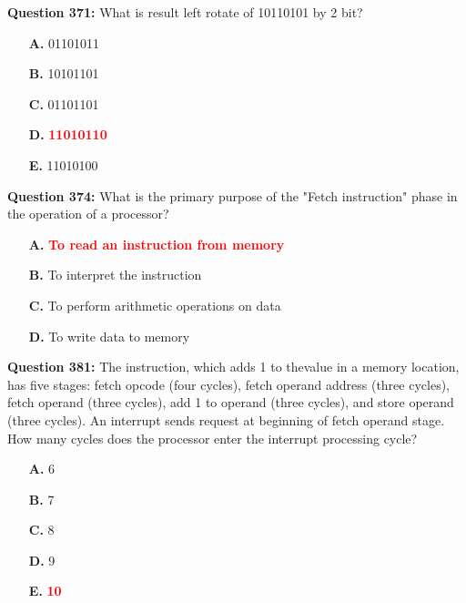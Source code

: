 \documentclass[12pt,a4paper]{article}
\begin{document}
\vspace{0.5cm}

\textbf{Question 371:} What is result left rotate of 10110101 by 2 bit?

\begin{itemize}
    \item[\textbf{A.}] 01101011
    \item[\textbf{B.}] 10101101
    \item[\textbf{C.}] 01101101
    \item[\textbf{D.}] \textcolor{red}{\textbf{11010110}}
    \item[\textbf{E.}] 11010100
\end{itemize}

\vspace{0.5cm}

\textbf{Question 374:} What is the primary purpose of the "Fetch instruction" phase in the operation of a processor?

\begin{itemize}
    \item[\textbf{A.}] \textcolor{red}{\textbf{To read an instruction from memory}}
    \item[\textbf{B.}] To interpret the instruction
    \item[\textbf{C.}] To perform arithmetic operations on data
    \item[\textbf{D.}] To write data to memory
\end{itemize}

\vspace{0.5cm}

\textbf{Question 381:} The instruction, which adds 1 to thevalue in a memory location, has five stages: fetch opcode (four cycles), fetch operand address (three cycles), fetch operand (three cycles), add 1 to operand (three cycles), and store operand (three cycles). An interrupt sends request at beginning of fetch operand stage. How many cycles does the processor enter the interrupt processing cycle?

\begin{itemize}
    \item[\textbf{A.}] 6
    \item[\textbf{B.}] 7
    \item[\textbf{C.}] 8
    \item[\textbf{D.}] 9
    \item[\textbf{E.}] \textcolor{red}{\textbf{10}}
\end{itemize}
\end{document}

